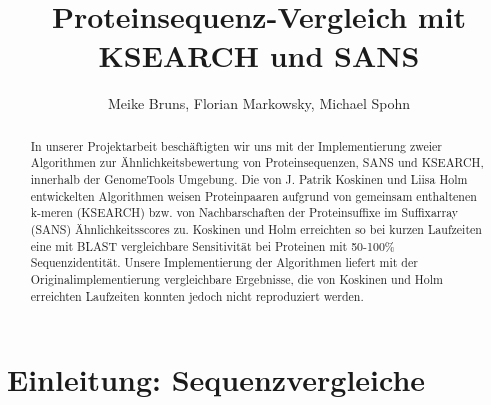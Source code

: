 \documentclass{article}
\title{Proteinsequenz-Vergleich mit KSEARCH und SANS}
\author{Meike Bruns, Florian Markowsky, Michael Spohn}
\begin{document}
\maketitle
\thispagestyle{empty}
\begin{abstract}

In unserer Projektarbeit beschäftigten wir uns mit der Implementierung zweier Algorithmen zur Ähnlichkeitsbewertung von Proteinsequenzen, SANS und KSEARCH, innerhalb der GenomeTools Umgebung. Die von J. Patrik Koskinen und Liisa Holm entwickelten Algorithmen weisen Proteinpaaren aufgrund von gemeinsam enthaltenen k-meren (KSEARCH) bzw. von Nachbarschaften der Proteinsuffixe im Suffixarray (SANS) Ähnlichkeitsscores zu. Koskinen und Holm erreichten so bei kurzen Laufzeiten eine mit BLAST vergleichbare Sensitivität bei Proteinen mit 50-100\% Sequenzidentität. Unsere Implementierung der Algorithmen liefert mit der Originalimplementierung vergleichbare Ergebnisse, die von Koskinen und Holm erreichten Laufzeiten konnten jedoch nicht reproduziert werden.

\end{abstract}
\newpage

\tableofcontents
\thispagestyle{empty}
\newpage

\section{Einleitung: Sequenzvergleiche}
\end{document}
